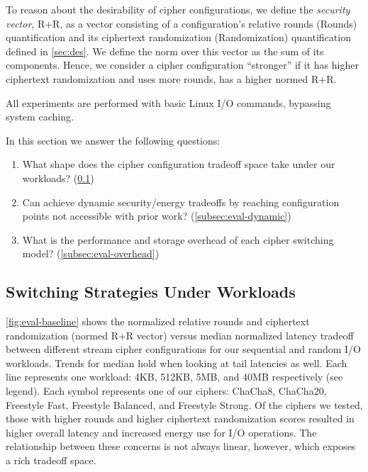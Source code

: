 To reason about the desirability of cipher configurations, we define the
{\em security vector}, R+R, as a vector consisting of a configuration's
relative rounds (Rounds) quantification and its ciphertext randomization
(Randomization) quantification defined in \cref{sec:des}. We define the norm
over this vector as the sum of its components. Hence, we consider a cipher
configuration ``stronger'' if it has higher ciphertext randomization and uses
more rounds, \ie has a higher normed R+R.

All experiments are performed with basic Linux I/O commands, bypassing system
caching.

In this section we answer the following questions:

\begin{enumerate}
  \item What shape does the cipher configuration tradeoff space take under our
  workloads? (\cref{subsec:eval-baseline})
  \item Can \sys achieve dynamic security/energy tradeoffs by reaching
  configuration points not accessible with prior work?
  (\cref{subsec:eval-dynamic})
  \item What is the performance and storage overhead of each cipher switching
  model? (\cref{subsec:eval-overhead})
\end{enumerate}


\subsection{Switching Strategies Under Workloads}\label{subsec:eval-baseline}



\cref{fig:eval-baseline} shows the normalized relative rounds and
ciphertext randomization (normed R+R vector) versus median normalized latency
tradeoff between different stream cipher configurations for our sequential and
random I/O workloads. Trends for median hold when looking at tail latencies as
well. Each line represents one workload: 4KB, 512KB, 5MB, and 40MB respectively
(see legend). Each symbol represents one of our ciphers: ChaCha8, ChaCha20,
Freestyle Fast, Freestyle Balanced, and Freestyle Strong. Of the ciphers we
tested, those with higher rounds and higher ciphertext randomization
scores resulted in higher overall latency and increased energy use for I/O
operations. The relationship between these concerns is not always linear,
however, which exposes a rich tradeoff space.

